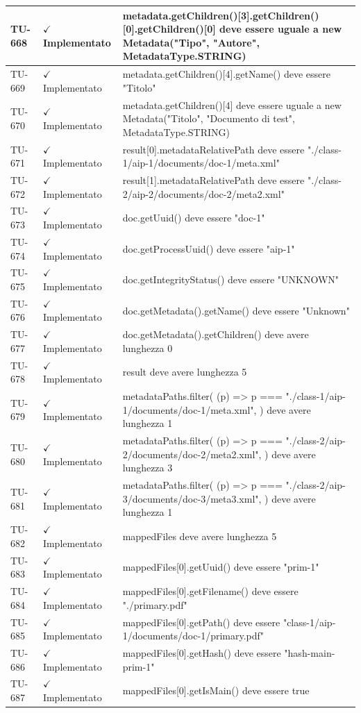 ﻿\documentclass[a4paper,12pt]{article}
\newcommand{\ok}{\textcolor{green!60!black}{$\checkmark$ Implementato}}
\begin{document}
\begin{longtable}{|p{2cm}|p{3.5cm}|p{9.5cm}|}
TU-668 & \ok & metadata.getChildren()[3].getChildren()[0].getChildren()[0] deve essere uguale a new Metadata("Tipo", "Autore", MetadataType.STRING) \\
\hline
TU-669 & \ok & metadata.getChildren()[4].getName() deve essere "Titolo" \\
\hline
TU-670 & \ok & metadata.getChildren()[4] deve essere uguale a new Metadata("Titolo", "Documento di test", MetadataType.STRING) \\
\hline
TU-671 & \ok & result[0].metadataRelativePath deve essere "./class-1/aip-1/documents/doc-1/meta.xml" \\
\hline
TU-672 & \ok & result[1].metadataRelativePath deve essere "./class-2/aip-2/documents/doc-2/meta2.xml" \\
\hline
TU-673 & \ok & doc.getUuid() deve essere "doc-1" \\
\hline
TU-674 & \ok & doc.getProcessUuid() deve essere "aip-1" \\
\hline
TU-675 & \ok & doc.getIntegrityStatus() deve essere "UNKNOWN" \\
\hline
TU-676 & \ok & doc.getMetadata().getName() deve essere "Unknown" \\
\hline
TU-677 & \ok & doc.getMetadata().getChildren() deve avere lunghezza 0 \\
\hline
TU-678 & \ok & result deve avere lunghezza 5 \\
\hline
TU-679 & \ok & metadataPaths.filter( (p) => p === "./class-1/aip-1/documents/doc-1/meta.xml", ) deve avere lunghezza 1 \\
\hline
TU-680 & \ok & metadataPaths.filter( (p) => p === "./class-2/aip-2/documents/doc-2/meta2.xml", ) deve avere lunghezza 3 \\
\hline
TU-681 & \ok & metadataPaths.filter( (p) => p === "./class-2/aip-3/documents/doc-3/meta3.xml", ) deve avere lunghezza 1 \\
\hline
TU-682 & \ok & mappedFiles deve avere lunghezza 5 \\
\hline
TU-683 & \ok & mappedFiles[0].getUuid() deve essere "prim-1" \\
\hline
TU-684 & \ok & mappedFiles[0].getFilename() deve essere "./primary.pdf" \\
\hline
TU-685 & \ok & mappedFiles[0].getPath() deve essere "class-1/aip-1/documents/doc-1/primary.pdf" \\
\hline
TU-686 & \ok & mappedFiles[0].getHash() deve essere "hash-main-prim-1" \\
\hline
TU-687 & \ok & mappedFiles[0].getIsMain() deve essere true \\

\end{longtable}
\end{document}
